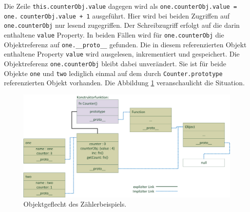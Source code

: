 Die Zeile \texttt{this.counterObj.value} dagegen wird als \texttt{one.counterObj.value = one.} \texttt{counterObj.value + 1} ausgeführt. Hier wird bei beiden Zugriffen auf \texttt{one.counterObj} nur lesend zugegriffen. Der Schreibzugriff erfolgt auf die darin enthaltene \texttt{value}  Property.
In beiden Fällen wird für \texttt{one.counterObj} die Objektreferenz auf \texttt{one.\_\_proto\_\_} gefunden. Die in diesem referenzierten Objekt enthaltene Property \texttt{value} wird ausgelesen, inkrementiert und gespeichert. Die Objektreferenz \texttt{one.counterObj} bleibt dabei unverändert. Sie ist für beide Objekte \texttt{one} und \texttt{two} lediglich einmal auf dem durch \texttt{Counter.prototype} referenzierten Objekt vorhanden.
Die Abbildung \ref{shadowing} veranschaulicht die Situation.
\begin{figure}[!h]
	\centering
	\includegraphics[width=\textwidth]{images/CounterPrototypeChain.png}
	\caption{\label{shadowing}Objektgeflecht des Zählerbeispiels.}
\end{figure}


